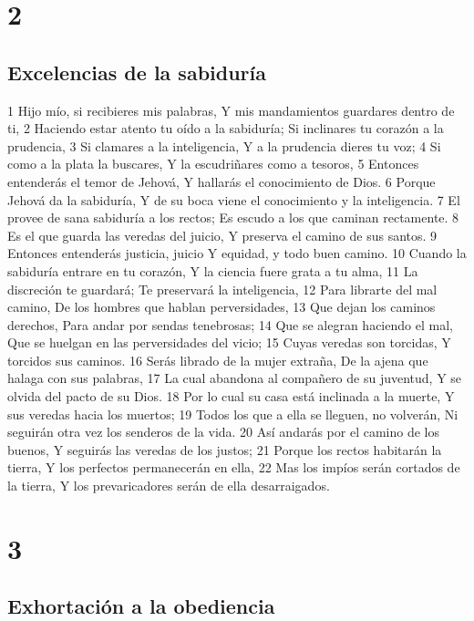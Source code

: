 \chapter{2}

\section*{Excelencias de la sabiduría}

1 Hijo mío, si recibieres mis palabras,
Y mis mandamientos guardares dentro de ti,
2 Haciendo estar atento tu oído a la sabiduría;
Si inclinares tu corazón a la prudencia,
3 Si clamares a la inteligencia,
Y a la prudencia dieres tu voz;
4 Si como a la plata la buscares,
Y la escudriñares como a tesoros,
5 Entonces entenderás el temor de Jehová,
Y hallarás el conocimiento de Dios.
6 Porque Jehová da la sabiduría,
Y de su boca viene el conocimiento y la inteligencia.
7 El provee de sana sabiduría a los rectos;
Es escudo a los que caminan rectamente.
8 Es el que guarda las veredas del juicio,
Y preserva el camino de sus santos.
9 Entonces entenderás justicia, juicio
Y equidad, y todo buen camino.
10 Cuando la sabiduría entrare en tu corazón,
Y la ciencia fuere grata a tu alma,
11 La discreción te guardará;
Te preservará la inteligencia,
12 Para librarte del mal camino,
De los hombres que hablan perversidades,
13 Que dejan los caminos derechos,
Para andar por sendas tenebrosas;
14 Que se alegran haciendo el mal,
Que se huelgan en las perversidades del vicio;
15 Cuyas veredas son torcidas,
Y torcidos sus caminos.
16 Serás librado de la mujer extraña, 
De la ajena que halaga con sus palabras,
17 La cual abandona al compañero de su juventud,
Y se olvida del pacto de su Dios.
18 Por lo cual su casa está inclinada a la muerte,
Y sus veredas hacia los muertos;
19 Todos los que a ella se lleguen, no volverán,
Ni seguirán otra vez los senderos de la vida.
20 Así andarás por el camino de los buenos,
Y seguirás las veredas de los justos;
21 Porque los rectos habitarán la tierra,
Y los perfectos permanecerán en ella,
22 Mas los impíos serán cortados de la tierra,
Y los prevaricadores serán de ella desarraigados.

\chapter{3}

\section*{Exhortación a la obediencia}


